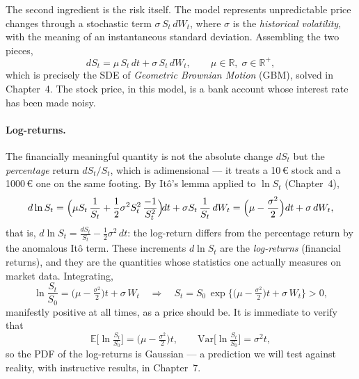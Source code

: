 The second ingredient is the risk itself.
The model represents unpredictable price changes through a stochastic term $\sigma\, S_t\, dW_t$, where $\sigma$ is the \emph{historical volatility}, with the meaning of an instantaneous standard deviation.
Assembling the two pieces,
\begin{equation}\label{eq:gbm-sde}
dS_t = \mu\, S_t\, dt + \sigma\, S_t\, dW_t, \qquad \mu\in\mathbb{R},\; \sigma\in\mathbb{R}^+,
\end{equation}
which is precisely the SDE of \emph{Geometric Brownian Motion} (GBM), solved in Chapter~4.
The stock price, in this model, is a bank account whose interest rate has been made noisy.

\paragraph*{Log-returns.}

The financially meaningful quantity is not the absolute change $dS_t$ but the \emph{percentage} return $dS_t/S_t$, which is adimensional --- it treats a 10\,\euro{} stock and a 1000\,\euro{} one on the same footing.
By It\^o's lemma applied to $\ln S_t$ (Chapter~4),
\begin{equation}
d\ln S_t = \Bigl(\mu S_t\,\frac{1}{S_t} + \frac{1}{2}\sigma^2 S_t^2\,\frac{-1}{S_t^2}\Bigr)\!dt + \sigma S_t\,\frac{1}{S_t}\,dW_t
= \Bigl(\mu - \frac{\sigma^2}{2}\Bigr)dt + \sigma\, dW_t,
\end{equation}
that is, $d\ln S_t = \frac{dS_t}{S_t} - \frac{1}{2}\sigma^2\,dt$: the log-return differs from the percentage return by the anomalous It\^o term.
These increments $d\ln S_t$ are the \emph{log-returns} (financial returns), and they are the quantities whose statistics one actually measures on market data.
Integrating,
\begin{equation}
\ln\frac{S_t}{S_0} = \bigl(\mu - \tfrac{\sigma^2}{2}\bigr)t + \sigma\, W_t
\quad\Longrightarrow\quad
S_t = S_0\,\exp\!\bigl\{\bigl(\mu-\tfrac{\sigma^2}{2}\bigr)t + \sigma\, W_t\bigr\} > 0,
\end{equation}
manifestly positive at all times, as a price should be.
It is immediate to verify that
\begin{equation}
\mathbb{E}\!\bigl[\ln\tfrac{S_t}{S_0}\bigr] = \bigl(\mu - \tfrac{\sigma^2}{2}\bigr)t, \qquad
\mathrm{Var}\!\bigl[\ln\tfrac{S_t}{S_0}\bigr] = \sigma^2 t,
\end{equation}
so the PDF of the log-returns is Gaussian --- a prediction we will test against reality, with instructive results, in Chapter~7.


